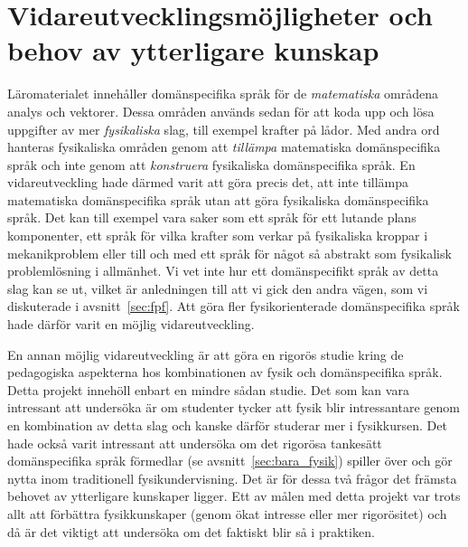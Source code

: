 
\section{Vidareutvecklingsmöjligheter och behov av ytterligare kunskap}

Läromaterialet innehåller domänspecifika språk för de \textit{matematiska}
områdena analys och vektorer. Dessa områden används sedan för att koda upp och
lösa uppgifter av mer \textit{fysikaliska} slag, till exempel krafter på lådor. Med andra ord hanteras fysikaliska områden genom att \textit{tillämpa} matematiska domänspecifika språk och inte genom att \textit{konstruera} fysikaliska domänspecifika språk. En vidareutveckling
hade därmed varit att göra precis det, att inte tillämpa matematiska
domänspecifika språk utan att göra fysikaliska domänspecifika språk. Det kan till exempel vara
saker som ett språk för ett lutande plans komponenter, ett språk för vilka krafter som verkar på fysikaliska kroppar i mekanikproblem eller till och med ett språk för något så abstrakt som
fysikalisk problemlösning i allmänhet. Vi vet inte hur ett domänspecifikt språk
av detta slag kan se ut, vilket är anledningen till att vi gick den andra vägen,
som vi diskuterade i avsnitt~\ref{sec:fpf}. Att göra fler fysikorienterade
domänspecifika språk hade därför varit en möjlig vidareutveckling.

En annan möjlig vidareutveckling är att göra en rigorös studie kring de
pedagogiska aspekterna hos kombinationen av fysik och domänspecifika språk.
Detta projekt innehöll enbart en mindre sådan studie. Det som kan vara
intressant att undersöka är om studenter tycker att fysik blir intressantare
genom en kombination av detta slag och kanske därför studerar mer i fysikkursen.
Det hade också varit intressant att undersöka om det rigorösa tankesätt
domänspecifika språk förmedlar (se avsnitt~\ref{sec:bara_fysik}) spiller över och
gör nytta inom traditionell fysikundervisning. Det är för dessa två frågor det
främsta behovet av ytterligare kunskaper ligger. Ett av målen med detta projekt var trots allt att förbättra fysikkunskaper (genom ökat intresse eller mer
rigorösitet) och då är det viktigt att undersöka om det faktiskt blir
så i praktiken.

